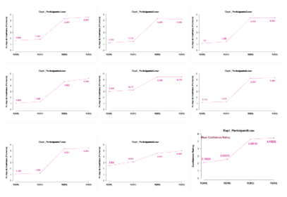 \documentclass[a4paper ]{article}
\begin{document}
\begin{figure}[th]
\centering
\includegraphics[width=0.3\textwidth]{Figures/MirrorRating_Exp1_P1} \includegraphics[width=0.3\textwidth]{Figures/MirrorRating_Exp1_P2} \includegraphics[width=0.3\textwidth]{Figures/MirrorRating_Exp1_P3}
\includegraphics[width=0.3\textwidth]{Figures/MirrorRating_Exp1_P4} \includegraphics[width=0.3\textwidth]{Figures/MirrorRating_Exp1_P5} \includegraphics[width=0.3\textwidth]{Figures/MirrorRating_Exp1_P6}
\includegraphics[width=0.3\textwidth]{Figures/MirrorRating_Exp1_P7} \includegraphics[width=0.3\textwidth]{Figures/MirrorRating_Exp1_P8} \includegraphics[width=0.3\textwidth]{Figures/MirrorRating_Exp1_P9}

\end{figure}
\end{document}
